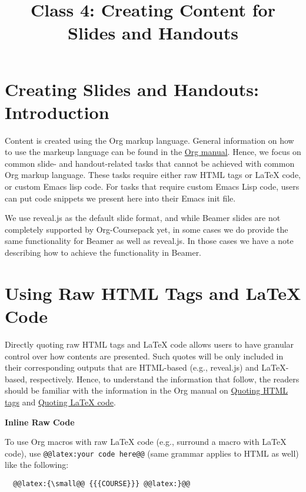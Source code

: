 \documentclass[10pt,article]{article}
\date{\vspace{-6ex}}
\title{Class 4: Creating Content for Slides and Handouts}
\begin{document}
\maketitle
{} 
\thispagestyle{fancy}

\setcounter{tocdepth}{1}
\tableofcontents
\vspace{6ex}

\section{Creating Slides and Handouts: Introduction}
\label{sec:org4b6395c}
Content is created using the Org markup language. General information on how
to use the markeup language can be found in the \href{https://orgmode.org/manual/Markup.html}{Org manual}. Hence,
we focus on common slide- and handout-related tasks that cannot be achieved
with common Org markup language. These tasks require either raw HTML tags or
\LaTeX{} code, or custom Emacs lisp code. For tasks that require custom Emacs
Lisp code, users can put code snippets we present here into their Emacs init
file.

\begin{mdframed}
We use reveal.js as the default slide format, and while Beamer slides are not
completely supported by Org-Coursepack yet, in some cases we do provide the same
functionality for Beamer as well as reveal.js. In those cases we have a
note describing how to achieve the functionality in Beamer.
\end{mdframed}
\section{Using Raw HTML Tags and \LaTeX{} Code}
\label{sec:org50b2080}
Directly quoting raw HTML tags and \LaTeX{} code allows users to have granular
control over how contents are presented. Such quotes will be only included in
their corresponding outputs that are HTML-based (e.g., reveal.js) and
\LaTeX{}-based, respectively. Hence, to understand the information that follow,
the readers should be familiar with the information in the Org manual on
\href{https://orgmode.org/manual/Quoting-HTML-tags.html}{Quoting HTML tags} and \href{https://orgmode.org/manual/Quoting-LaTeX-code.html}{Quoting \LaTeX{} code}.

\begin{mdframed}
\textbf{Inline Raw Code}

To use Org macros with raw \LaTeX{} code (e.g., surround a macro with
\LaTeX{} code), use \texttt{@@latex:your code here@@} (same grammar
applies to HTML as well) like the following:

\begin{verbatim}
  @@latex:{\small@@ {{{COURSE}}} @@latex:}@@
\end{verbatim}
\end{mdframed}
\end{document}
